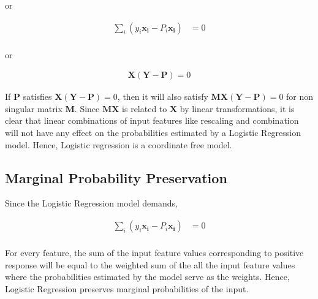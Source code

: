 \documentclass[11pt, a4paper]{article}
\begin{document}
or 

\begin{align*}
	\sum_i \left(y_i \boldsymbol{x_i} - P_i \boldsymbol{x_i}\right) & = 0 \\
\end{align*}

or 

\begin{align*}
	\boldsymbol{X}(\boldsymbol{Y}-\boldsymbol{P}) = 0 
\end{align*}

If $\boldsymbol{P}$ satisfies $ \boldsymbol{X}(\boldsymbol{Y}-\boldsymbol{P}) = 0$, then it will also satisfy $\boldsymbol{M}\boldsymbol{X}(\boldsymbol{Y}-\boldsymbol{P}) = 0$ for non singular matrix $\boldsymbol{M}$. Since $\boldsymbol{M}\boldsymbol{X}$ is related to $\boldsymbol{X}$ by linear transformations, it is clear that linear combinations of input features like rescaling and combination will not have any effect on the probabilities estimated by a Logistic Regression model. Hence, Logistic regression is a coordinate free model.

\subsection{Marginal Probability Preservation}

Since the Logistic Regression model demands,

\begin{align*}
	\sum_i \left(y_i \boldsymbol{x_i} - P_i \boldsymbol{x_i}\right) & = 0 \\
\end{align*}

For every feature, the sum of the input feature values corresponding to positive response will be equal to the weighted sum of the all the input feature values where the probabilities estimated by the model serve as the weights. Hence, Logistic Regression preserves marginal probabilities of the input.
\end{document}
